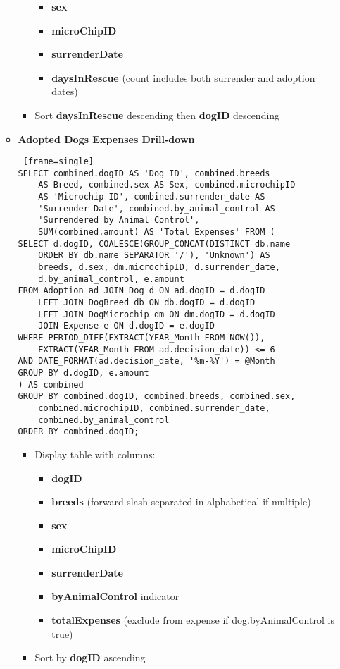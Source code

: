 \documentclass{article}
\begin{document}
\begin{itemize}
\begin{itemize}
\begin{itemize}
\begin{itemize}
                \item \textbf{sex}
                \item \textbf{microChipID}
                \item \textbf{surrenderDate}
                \item \textbf{daysInRescue} (count includes both surrender and adoption dates)
            \end{itemize}
            \item Sort \textbf{daysInRescue} descending then \textbf{dogID} descending
        \end{itemize}
    \end{itemize}
    \begin{itemize}
        \item \textbf{Adopted Dogs Expenses Drill-down}
        \begin{Verbatim} [frame=single]
SELECT combined.dogID AS 'Dog ID', combined.breeds 
    AS Breed, combined.sex AS Sex, combined.microchipID 
    AS 'Microchip ID', combined.surrender_date AS 
    'Surrender Date', combined.by_animal_control AS 
    'Surrendered by Animal Control', 
    SUM(combined.amount) AS 'Total Expenses' FROM (
SELECT d.dogID, COALESCE(GROUP_CONCAT(DISTINCT db.name 
    ORDER BY db.name SEPARATOR '/'), 'Unknown') AS 
    breeds, d.sex, dm.microchipID, d.surrender_date, 
    d.by_animal_control, e.amount
FROM Adoption ad JOIN Dog d ON ad.dogID = d.dogID 
    LEFT JOIN DogBreed db ON db.dogID = d.dogID 
    LEFT JOIN DogMicrochip dm ON dm.dogID = d.dogID 
    JOIN Expense e ON d.dogID = e.dogID
WHERE PERIOD_DIFF(EXTRACT(YEAR_Month FROM NOW()), 
    EXTRACT(YEAR_Month FROM ad.decision_date)) <= 6
AND DATE_FORMAT(ad.decision_date, '%m-%Y') = @Month
GROUP BY d.dogID, e.amount
) AS combined
GROUP BY combined.dogID, combined.breeds, combined.sex, 
    combined.microchipID, combined.surrender_date, 
    combined.by_animal_control
ORDER BY combined.dogID;
        \end{Verbatim}
        \begin{itemize}
            \item Display table with columns:
            \begin{itemize}
                \item \textbf{dogID}
                \item \textbf{breeds} (forward slash-separated in alphabetical if multiple)
                \item \textbf{sex}
                \item \textbf{microChipID}
                \item \textbf{surrenderDate}
                \item \textbf{byAnimalControl} indicator
                \item \textbf{totalExpenses} (exclude from expense if dog.byAnimalControl is true)
            \end{itemize}
            \item Sort by \textbf{dogID} ascending
        \end{itemize}
    \end{itemize}
\end{itemize}  
\end{document}
